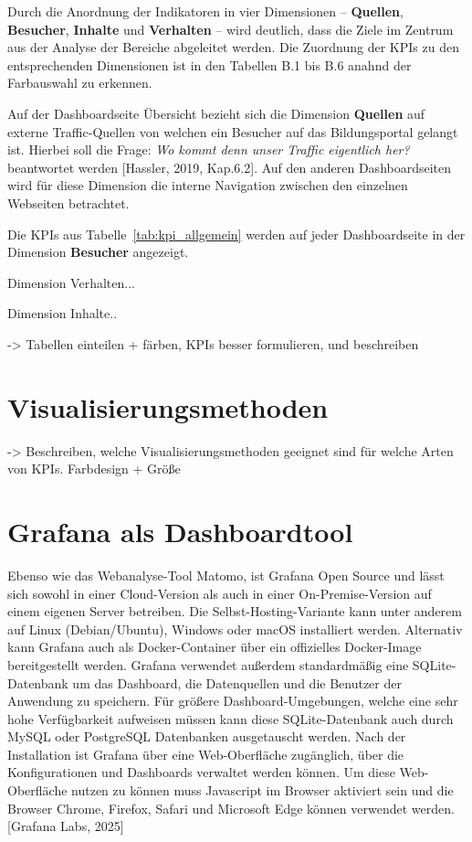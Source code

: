 Durch die Anordnung der Indikatoren in vier Dimensionen – \textbf{Quellen}, \textbf{Besucher}, \textbf{Inhalte} und \textbf{Verhalten} – wird deutlich, dass die Ziele im Zentrum aus der Analyse der Bereiche abgeleitet werden. Die Zuordnung der KPIs zu den entsprechenden Dimensionen ist in den Tabellen B.1 bis B.6 anahnd der Farbauswahl zu erkennen.

Auf der Dashboardseite \glqq Übersicht\grqq{} bezieht sich die Dimension \textbf{Quellen} auf externe Traffic-Quellen von welchen ein Besucher auf das Bildungsportal gelangt ist. Hierbei soll die Frage: \textit{\glqq Wo kommt denn unser Traffic eigentlich her?\grqq{}} beantwortet werden [Hassler, 2019, Kap.6.2]. Auf den anderen Dashboardseiten wird für diese Dimension die interne Navigation zwischen den einzelnen Webseiten betrachtet. 

Die KPIs aus Tabelle~\ref{tab:kpi_allgemein} werden auf jeder Dashboardseite in der Dimension \textbf{Besucher} angezeigt.


Dimension Verhalten...

Dimension Inhalte..


-> Tabellen einteilen + färben, KPIs besser formulieren, und beschreiben

\section{Visualisierungsmethoden}
-> Beschreiben, welche Visualisierungsmethoden geeignet sind für welche Arten von KPIs. Farbdesign + Größe

\section{Grafana als Dashboardtool}
Ebenso wie das Webanalyse-Tool Matomo, ist Grafana Open Source und lässt sich sowohl in einer Cloud-Version als auch in einer On-Premise-Version auf einem eigenen Server betreiben. Die Selbst-Hosting-Variante kann unter anderem auf Linux (Debian/Ubuntu), Windows oder macOS installiert werden. Alternativ kann Grafana auch als Docker-Container über ein offizielles Docker-Image bereitgestellt werden. Grafana verwendet außerdem standardmäßig eine SQLite-Datenbank um das Dashboard, die Datenquellen und die Benutzer der Anwendung zu speichern. Für größere Dashboard-Umgebungen, welche eine sehr hohe Verfügbarkeit aufweisen müssen kann diese SQLite-Datenbank auch durch MySQL oder PostgreSQL Datenbanken ausgetauscht werden. Nach der Installation ist Grafana über eine Web-Oberfläche zugänglich, über die Konfigurationen und Dashboards verwaltet werden können. Um diese Web-Oberfläche nutzen zu können muss Javascript im Browser aktiviert sein und die Browser Chrome, Firefox, Safari und Microsoft Edge können verwendet werden. [Grafana Labs, 2025]

